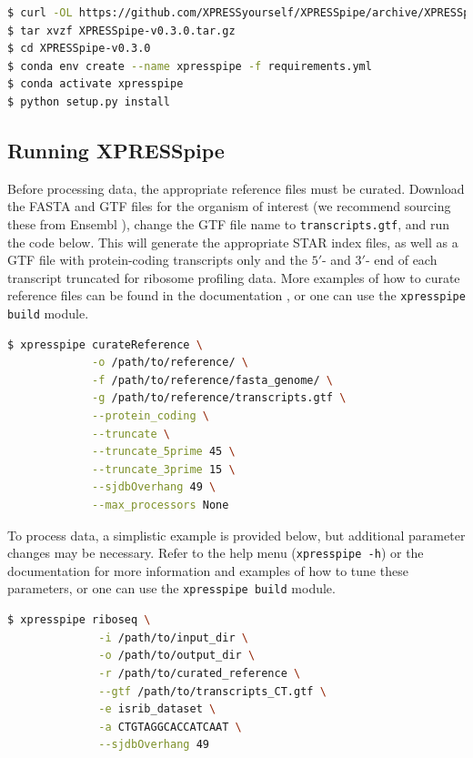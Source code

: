 \documentclass[10pt, oneside]{article}
\begin{document}
\begin{lstlisting}[language=bash, caption=XPRESSyourself installation]
$ curl -OL https://github.com/XPRESSyourself/XPRESSpipe/archive/XPRESSpipe-v0.3.0.tar.gz
$ tar xvzf XPRESSpipe-v0.3.0.tar.gz
$ cd XPRESSpipe-v0.3.0
$ conda env create --name xpresspipe -f requirements.yml
$ conda activate xpresspipe
$ python setup.py install
\end{lstlisting}

\subsection*{Running XPRESSpipe}
Before processing data, the appropriate reference files must be curated. Download the FASTA and GTF files for the organism of interest (we recommend sourcing these from Ensembl \cite{ensembl}), change the GTF file name to \texttt{transcripts.gtf}, and run the code below. This will generate the appropriate STAR index files, as well as a GTF file with protein-coding transcripts only and the $5'$- and $3'$- end of each transcript truncated for ribosome profiling data. More examples of how to curate reference files can be found in the documentation \cite{xpresspipe_docs}, or one can use the \texttt{xpresspipe build} module.

\begin{lstlisting}[language=bash, caption=curateReference example]
$ xpresspipe curateReference \
             -o /path/to/reference/ \
             -f /path/to/reference/fasta_genome/ \
             -g /path/to/reference/transcripts.gtf \
             --protein_coding \
             --truncate \
             --truncate_5prime 45 \
             --truncate_3prime 15 \
             --sjdbOverhang 49 \
             --max_processors None
\end{lstlisting}

To process data, a simplistic example is provided below, but additional parameter changes may be necessary. Refer to the help menu (\texttt{xpresspipe -h}) or the documentation \cite{xpresspipe_docs} for more information and examples of how to tune these parameters, or one can use the \texttt{xpresspipe build} module.

\begin{lstlisting}[language=bash, caption=riboseq pipeline example]
$ xpresspipe riboseq \
              -i /path/to/input_dir \
              -o /path/to/output_dir \
              -r /path/to/curated_reference \
              --gtf /path/to/transcripts_CT.gtf \
              -e isrib_dataset \
              -a CTGTAGGCACCATCAAT \
              --sjdbOverhang 49
\end{lstlisting}
\end{document}
